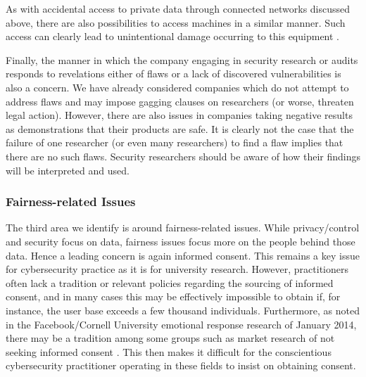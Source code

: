 \documentclass{svjour3}                     %
\begin{document}
As with accidental access to private data through connected networks discussed above, there are also possibilities to access machines in a similar manner. Such access can clearly lead to unintentional damage occurring to this equipment \cite[p.~125]{robinson2011ethical}.

Finally, the manner in which the company engaging in security research or audits responds to revelations either of flaws or a lack of discovered vulnerabilities is also a concern. We have already considered companies which do not attempt to address flaws and may impose gagging clauses on researchers (or worse, threaten legal action). However, there are also issues in companies taking negative results as demonstrations that their products are safe. It is clearly not the case that the failure of one researcher (or even many researchers) to find a flaw implies that there are no such flaws. Security researchers should be aware of how their findings will be interpreted and used.

\subsubsection{Fairness-related Issues}
The third area we identify is around fairness-related issues. While privacy/control and security focus on data, fairness issues focus more on the people behind those data. Hence a leading concern is again informed consent.  This remains a key issue for cybersecurity practice as it is for university research.  However, practitioners often lack a tradition or relevant policies regarding the sourcing of informed consent, and in many cases this may be effectively impossible to obtain if, for instance, the user base exceeds a few thousand individuals. Furthermore, as noted in the Facebook/Cornell University emotional response research of January 2014, there may be a tradition among some groups such as market research of not seeking informed consent \cite{meyer2014everything}. This then makes it difficult for the conscientious cybersecurity practitioner operating in these fields to insist on obtaining consent.
\end{document}
